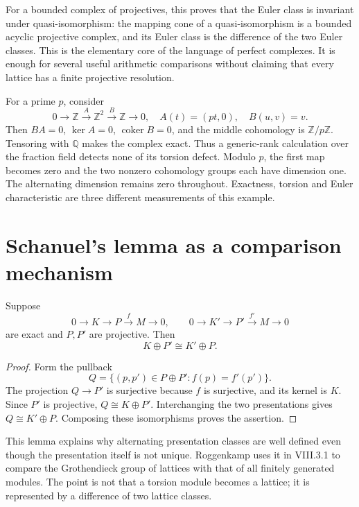 For a bounded complex of projectives, this proves that the Euler class is invariant under quasi-isomorphism: the mapping cone of a quasi-isomorphism is a bounded acyclic projective complex, and its Euler class is the difference of the two Euler classes. This is the elementary core of the language of perfect complexes. It is enough for several useful arithmetic comparisons without claiming that every lattice has a finite projective resolution.

\begin{example}
For a prime $p$, consider
\[
0\longrightarrow\mathbb Z\xrightarrow{A}\mathbb Z^2
 \xrightarrow{B}\mathbb Z\longrightarrow0,
\quad A(t)=(pt,0),\quad B(u,v)=v.
\]
Then $BA=0$, $\ker A=0$, $\operatorname{coker}B=0$, and the middle cohomology is $\mathbb Z/p\mathbb Z$. Tensoring with $\mathbb Q$ makes the complex exact. Thus a generic-rank calculation over the fraction field detects none of its torsion defect. Modulo $p$, the first map becomes zero and the two nonzero cohomology groups each have dimension one. The alternating dimension remains zero throughout. Exactness, torsion and Euler characteristic are three different measurements of this example.
\end{example}

\section{Schanuel's lemma as a comparison mechanism}

\begin{theorem}
Suppose
\[
0\to K\to P\xrightarrow{f}M\to0,
\qquad
0\to K'\to P'\xrightarrow{f'}M\to0
\]
are exact and $P,P'$ are projective. Then
\[
K\oplus P'\cong K'\oplus P.
\]
\end{theorem}
\begin{proof}
Form the pullback
\[
Q=\{(p,p')\in P\oplus P':f(p)=f'(p')\}.
\]
The projection $Q\to P'$ is surjective because $f$ is surjective, and its kernel is $K$. Since $P'$ is projective, $Q\cong K\oplus P'$. Interchanging the two presentations gives $Q\cong K'\oplus P$. Composing these isomorphisms proves the assertion.
\end{proof}

This lemma explains why alternating presentation classes are well defined even though the presentation itself is not unique. Roggenkamp uses it in VIII.3.1 to compare the Grothendieck group of lattices with that of all finitely generated modules. The point is not that a torsion module becomes a lattice; it is represented by a difference of two lattice classes.\cite[Theorem VIII.3.1]{v2Roggenkamp1970II}

